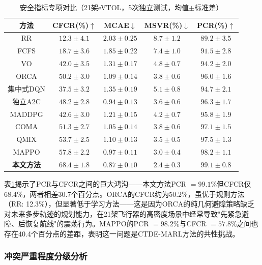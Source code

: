 \documentclass[12pt,a4paper,UTF8]{ctexart}
\begin{document}
\begin{table}[H]
    \centering
    \caption{安全指标专项对比（21架eVTOL，5次独立测试，均值$\pm$标准差）}
    \label{tab:safety_metrics}
    \begin{tabular}{|c|c|c|c|c|}
        \hline
        \textbf{方法} & \textbf{CFCR(\%)$\uparrow$} & \textbf{MCAE$\downarrow$} & \textbf{MSVR(\%)$\downarrow$} & \textbf{PCR(\%)$\uparrow$} \\
        \hline
        RR & $12.3 \pm 4.1$ & $2.03 \pm 0.25$ & $8.7 \pm 1.2$ & $89.2 \pm 3.5$ \\
        FCFS & $18.7 \pm 3.6$ & $1.85 \pm 0.22$ & $7.4 \pm 1.0$ & $91.5 \pm 2.8$ \\
        VO & $42.0 \pm 3.5$ & $1.31 \pm 0.17$ & $4.8 \pm 0.7$ & $94.2 \pm 2.0$ \\
        ORCA & $50.2 \pm 3.0$ & $1.09 \pm 0.14$ & $3.8 \pm 0.6$ & $96.0 \pm 1.6$ \\
        集中式DQN & $37.5 \pm 3.2$ & $1.35 \pm 0.19$ & $5.1 \pm 0.8$ & $94.7 \pm 2.1$ \\
        独立A2C & $48.2 \pm 2.8$ & $0.94 \pm 0.13$ & $3.6 \pm 0.6$ & $96.3 \pm 1.7$ \\
        MADDPG & $42.6 \pm 3.0$ & $1.21 \pm 0.15$ & $4.2 \pm 0.7$ & $95.8 \pm 1.9$ \\
        COMA & $51.3 \pm 2.7$ & $1.05 \pm 0.14$ & $3.8 \pm 0.6$ & $97.1 \pm 1.5$ \\
        QMIX & $53.7 \pm 2.5$ & $1.10 \pm 0.13$ & $3.5 \pm 0.5$ & $97.5 \pm 1.3$ \\
        MAPPO & $57.8 \pm 2.2$ & $0.97 \pm 0.11$ & $3.0 \pm 0.4$ & $98.2 \pm 1.1$ \\
        \textbf{本文方法} & $\mathbf{68.4 \pm 1.8}$ & $\mathbf{0.87 \pm 0.10}$ & $\mathbf{2.4 \pm 0.3}$ & $\mathbf{99.1 \pm 0.8}$ \\
        \hline
    \end{tabular}
\end{table}

表\ref{tab:safety_metrics}揭示了PCR与CFCR之间的巨大鸿沟——本文方法PCR $= 99.1\%$但CFCR仅$68.4\%$，两者相差30.7个百分点。ORCA的CFCR约为50.2\%，虽优于规则方法（RR: 12.3\%），但显著低于学习方法——这是因为ORCA的纯几何避障策略缺乏对未来多步轨迹的规划能力，在21架飞行器的高密度场景中经常导致"先紧急避障、后恢复航线"的震荡行为。MAPPO的PCR $= 98.2\%$与CFCR $= 57.8\%$之间也存在40.4个百分点的差距，表明这一问题是CTDE-MARL方法的共性挑战。

\subsubsection{冲突严重程度分级分析}
\end{document}
